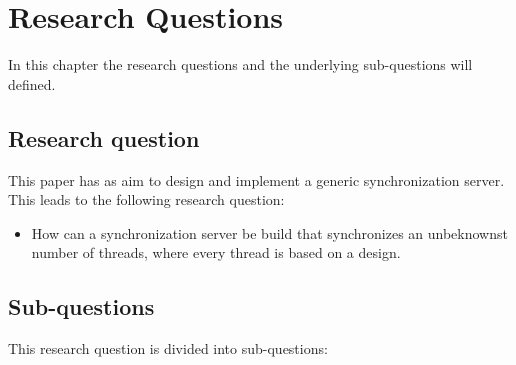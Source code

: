 \hypertarget{research-questions}{%
\section{Research Questions}\label{research-questions}}

In this chapter the research questions and the underlying sub-questions
will defined.

\hypertarget{research-question}{%
\subsection{Research question}\label{research-question}}

This paper has as aim to design and implement a generic synchronization
server. This leads to the following research question:

\begin{itemize}
\tightlist
\item
  How can a synchronization server be build that synchronizes an
  unbeknownst number of threads, where every thread is based on a
  design.
\end{itemize}

\hypertarget{sub-questions}{%
\subsection{Sub-questions}\label{sub-questions}}

This research question is divided into sub-questions:

